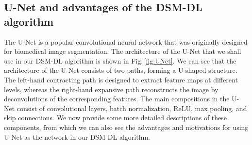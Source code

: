\documentclass{article}
\begin{document}
\subsection{U-Net and advantages of the DSM-DL algorithm}\label{unet}
The U-Net\cite{ronneberger2015u} is a popular convolutional neural network that was originally designed for biomedical image segmentation. The architecture of the U-Net that we shall use in our DSM-DL algorithm is shown in Fig.\,\ref{fig:UNet}. We can see that the architecture of the U-Net consists of two paths, forming a U-shaped structure. The left-hand contracting path is designed to extract feature maps at different levels, whereas the right-hand expansive path reconstructs the image by deconvolutions of the corresponding features. The main compositions in the U-Net consist of convolutional layers, batch normalization, ReLU, max pooling, and skip connections. We now provide some more detailed descriptions of these components, from which we can also see the advantages and motivations for using U-Net as the network in our DSM-DL 
algorithm. 
\end{document}
